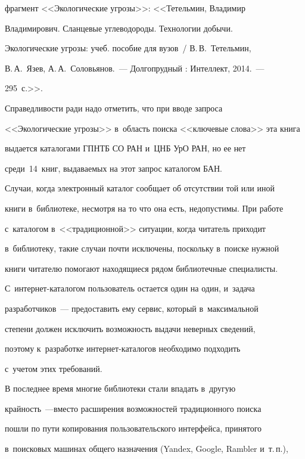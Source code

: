 фрагмент <<Экологические угрозы>>: <<Тетельмин, Владимир 


Владимирович. Сланцевые углеводороды. Технологии добычи. 


Экологические угрозы: учеб. пособие для вузов~/ В.\,В.~Тетельмин, 


В.\,А.~Язев, А.\,А.~Соловьянов.~--- Долгопрудный : Интеллект, 2014.~--- 


295~с.>>.


  


  Справедливости ради надо отметить, что при вводе запроса 


<<Экологические угрозы>> в~область поиска <<ключевые слова>> эта книга 


выдается каталогами ГПНТБ СО РАН и~ЦНБ УрО РАН, но ее нет 


среди~14~книг, выдаваемых на этот запрос каталогом БАН. 


  


  Случаи, когда электронный каталог сообщает об отсутствии той или иной 


книги в~библиотеке, несмотря на то что она есть, недопустимы. При работе 


с~каталогом в~<<традиционной>> ситуации, когда читатель приходит 


в~библиотеку, такие случаи почти исключены, поскольку в~поиске нужной 


книги читателю помогают находящиеся рядом библиотечные специалисты. 


С~ин\-тер\-нет-ка\-та\-ло\-гом пользователь остается один на один, и~задача 


разработчиков~--- предоставить ему сервис, который в~максимальной 


степени должен исключить возможность выдачи неверных сведений, 


поэтому к~разработке ин\-тер\-нет-ка\-та\-ло\-гов необходимо подходить 


с~учетом этих требований. 


  


  В последнее время многие библиотеки стали впадать в~другую  


крайность~---вмес\-то расширения возможностей традиционного поиска 


пошли по пути копирования пользовательского интерфейса, принятого 


в~поисковых машинах общего назначения (Yandex, Google, Rambler и~т.\,п.), 



